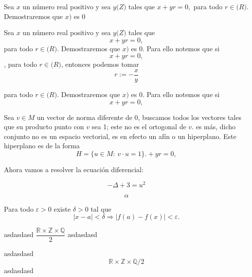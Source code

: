\documentclass[a5paper, 12pt]{article}
\begin{document}
Sea \(x\) un número real positivo y sea \(y \mathbb(Z)\) tales que
	\(
	x + yr = 0,
	\) 
	para todo \(r \in \mathbb(R)\). Demostraremos que \(x)\) es \(0\)
	
\vspace{2\baselineskip}

Sea \(x\) un número real positivo y sea \(y \mathbb(Z)\) tales que
	\[
	x + yr = 0,
	\] 
	para todo \(r \in \mathbb(R)\). Demostraremos que \(x)\) es \(0\). Para ello notemos que si
	\[
	x + yr = 0,
	\],
	para todo \(r \in \mathbb(R)\), entonces podemos tomar
	\[
	r:=-\dfrac{x}{y}
	\]
	
	para todo \(r \in \mathbb(R)\). Demostraremos que \(x)\) es \(0\). Para ello notemos que si
	\[
	x + yr = 0,
	\]	
	

\vspace{2\baselineskip}
\begin{multicols}{2}


Sea \(v \in M\) un vector de norma diferente de 0, buscamos todos los vectores tales que su producto punto con \(v\) sea 1; este no es el ortogonal de \(v\). es más, dicho conjunto no es un espacio vectorial, es en efecto un afín o un hiperplano. Este hiperplano es de la forma
	\[
	H=\{u \in M :\ v \cdot u = 1\} . + yr = 0,
	\]	

\end{multicols}


Ahora vamos a resolver la ecuación diferencial:

\[
	-\Delta + 3 = u^2
\]

\[
	\alpha
\]


Para todo \(\varepsilon	> 0 \) existe \(\delta >0 \) tal que
\[
	|x-a|< \delta \Rightarrow |f(a) - f(x) | < \varepsilon.
\]

\vspace{2\baselineskip}
asdasdasd
\(
	\dfrac{\mathbb R \times \mathbb Z \times \mathbb Q }{2}
\)
asdasdasd
\vspace{2\baselineskip}

asdasdasd
\[
	\mathbb {R} \times \mathbb {Z} \times \mathbb {Q}/2
\]
asdasdasd
\end{document}
